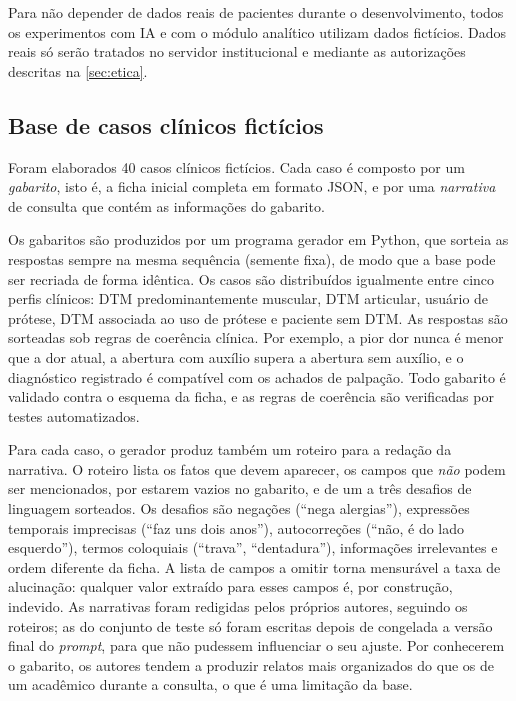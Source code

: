 Para não depender de dados reais de pacientes durante o desenvolvimento, todos os experimentos com IA e com o módulo analítico utilizam dados fictícios. Dados reais só serão tratados no servidor institucional e mediante as autorizações descritas na \autoref{sec:etica}.

\subsection{Base de casos clínicos fictícios}
\label{sec:casos}

Foram elaborados 40 casos clínicos fictícios. Cada caso é composto por um \emph{gabarito}, isto é, a ficha inicial completa em formato JSON, e por uma \emph{narrativa} de consulta que contém as informações do gabarito.

Os gabaritos são produzidos por um programa gerador em Python, que sorteia as respostas sempre na mesma sequência (semente fixa), de modo que a base pode ser recriada de forma idêntica. Os casos são distribuídos igualmente entre cinco perfis clínicos: DTM predominantemente muscular, DTM articular, usuário de prótese, DTM associada ao uso de prótese e paciente sem DTM. As respostas são sorteadas sob regras de coerência clínica. Por exemplo, a pior dor nunca é menor que a dor atual, a abertura com auxílio supera a abertura sem auxílio, e o diagnóstico registrado é compatível com os achados de palpação. Todo gabarito é validado contra o esquema da ficha, e as regras de coerência são verificadas por testes automatizados.

Para cada caso, o gerador produz também um roteiro para a redação da narrativa. O roteiro lista os fatos que devem aparecer, os campos que \emph{não} podem ser mencionados, por estarem vazios no gabarito, e de um a três desafios de linguagem sorteados. Os desafios são negações (``nega alergias''), expressões temporais imprecisas (``faz uns dois anos''), autocorreções (``não, é do lado esquerdo''), termos coloquiais (``trava'', ``dentadura''), informações irrelevantes e ordem diferente da ficha. A lista de campos a omitir torna mensurável a taxa de alucinação: qualquer valor extraído para esses campos é, por construção, indevido. As narrativas foram redigidas pelos próprios autores, seguindo os roteiros; as do conjunto de teste só foram escritas depois de congelada a versão final do \textit{prompt}, para que não pudessem influenciar o seu ajuste. Por conhecerem o gabarito, os autores tendem a produzir relatos mais organizados do que os de um acadêmico durante a consulta, o que é uma limitação da base.


